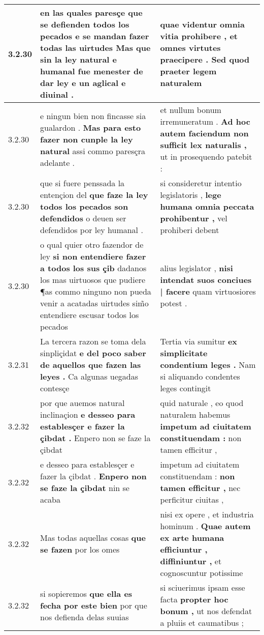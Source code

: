 \begin{tabular}{|p{1cm}|p{6.5cm}|p{6.5cm}|}
3.2.30 & en las quales paresçe que se defienden todos los pecados \textbf{ e se mandan fazer todas las uirtudes } Mas que sin la ley natural e humanal fue menester de dar ley e un aglical e diuinal . & quae videntur omnia vitia prohibere , \textbf{ et omnes virtutes praecipere . } Sed quod praeter legem naturalem \\\hline
3.2.30 & e ningun bien non fincasse sia gualardon . \textbf{ Mas para esto fazer non cunple la ley natural } assi commo paresçra adelante . & et nullum bonum irremuneratum . \textbf{ Ad hoc autem faciendum non sufficit lex naturalis , } ut in prosequendo patebit : \\\hline
3.2.30 & que si fuere penssada la entençion del \textbf{ que faze la ley todos los pecados son defendidos } o deuen ser defendidos por ley humanal . & si consideretur intentio legislatoris , \textbf{ lege humana omnia peccata prohibentur , } vel prohiberi debent \\\hline
3.2.30 & o qual quier otro fazendor de ley \textbf{ si non entendiere fazer a todos los sus çib } dadanos los mas uirtuosos que pudiere ¶as commo ninguno non pueda venir a acatadas uirtudes sim̃o entendiere escusar todos los pecados & alius legislator , \textbf{ nisi intendat suos conciues | facere } quam virtuosiores potest . \\\hline
3.2.31 & La tercera razon se toma dela sinpliçidat \textbf{ e del poco saber de aquellos que fazen las leyes . } Ca algunas uegadas contesçe & Tertia via sumitur \textbf{ ex simplicitate condentium leges . } Nam si aliquando condentes leges contingit \\\hline
3.2.32 & por que auemos natural inclinaçion \textbf{ e desseo para establesçer e fazer la çibdat . } Enpero non se faze la çibdat & quid naturale , eo quod naturalem habemus \textbf{ impetum ad ciuitatem constituendam : } non tamen efficitur , \\\hline
3.2.32 & e desseo para establesçer e fazer la çibdat . \textbf{ Enpero non se faze la çibdat } nin se acaba & impetum ad ciuitatem constituendam : \textbf{ non tamen efficitur , } nec perficitur ciuitas , \\\hline
3.2.32 & Mas todas aquellas cosas \textbf{ que se fazen } por los omes & nisi ex opere , et industria hominum . \textbf{ Quae autem ex arte humana efficiuntur , diffiniuntur , } et cognoscuntur potissime \\\hline
3.2.32 & si sopieremos \textbf{ que ella es fecha por este bien } por que nos defienda delas suuias & si sciuerimus ipsam esse facta \textbf{ propter hoc bonum , } ut nos defendat a pluiis et caumatibus ; \\\hline

\end{tabular}
